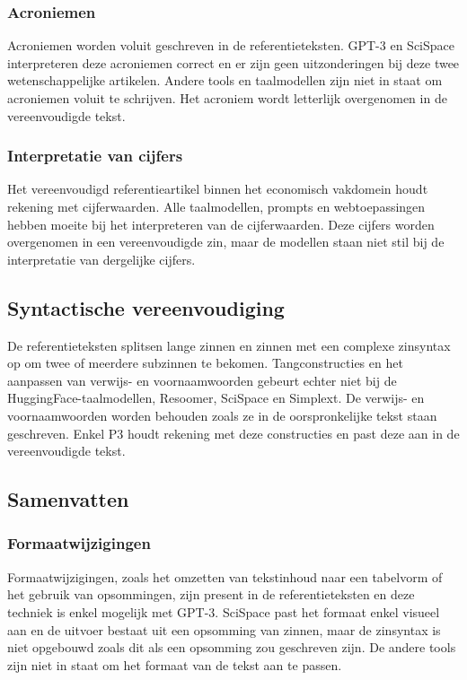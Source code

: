 \subsubsection{Acroniemen}
Acroniemen worden voluit geschreven in de referentieteksten. GPT-3 en SciSpace interpreteren deze acroniemen correct en er zijn geen uitzonderingen bij deze twee wetenschappelijke artikelen. Andere tools en taalmodellen zijn niet in staat om acroniemen voluit te schrijven. Het acroniem wordt letterlijk overgenomen in de vereenvoudigde tekst.

\subsubsection{Interpretatie van cijfers}
Het vereenvoudigd referentieartikel binnen het economisch vakdomein houdt rekening met cijferwaarden. Alle taalmodellen, prompts en webtoepassingen hebben moeite bij het interpreteren van de cijferwaarden. Deze cijfers worden overgenomen in een vereenvoudigde zin, maar de modellen staan niet stil bij de interpretatie van dergelijke cijfers.

\subsection{Syntactische vereenvoudiging}
De referentieteksten splitsen lange zinnen en zinnen met een complexe zinsyntax op om twee of meerdere subzinnen te bekomen. Tangconstructies en het aanpassen van verwijs- en voornaamwoorden gebeurt echter niet bij de HuggingFace-taalmodellen, Resoomer, SciSpace en Simplext. De verwijs- en voornaamwoorden worden behouden zoals ze in de oorspronkelijke tekst staan geschreven. Enkel P3 houdt rekening met deze constructies en past deze aan in de vereenvoudigde tekst.

\subsection{Samenvatten}
\subsubsection{Formaatwijzigingen}
Formaatwijzigingen, zoals het omzetten van tekstinhoud naar een tabelvorm of het gebruik van opsommingen, zijn present in de referentieteksten en deze techniek is enkel mogelijk met GPT-3. SciSpace past het formaat enkel visueel aan en de uitvoer bestaat uit een opsomming van zinnen, maar de zinsyntax is niet opgebouwd zoals dit als een opsomming zou geschreven zijn. De andere tools zijn niet in staat om het formaat van de tekst aan te passen. 

